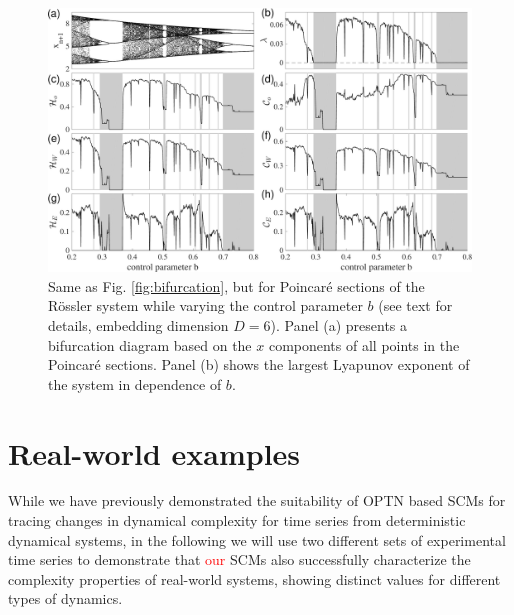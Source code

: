 \documentclass[aip,cha,reprint,nofootinbib]{revtex4-1}
\begin{document}
\begin{figure}
	\centering 
	\includegraphics[width=2\columnwidth]{rosslerEntropy.pdf}
\caption{\small{Same as Fig. \ref{fig:bifurcation}, but for Poincar\'e sections of the R\"ossler system while varying the control parameter $b$ (see text for details{\color{red}, embedding dimension $D = 6$).} Panel (a) presents a bifurcation diagram based on the $x$ components of all points in the Poincar\'e sections. Panel (b) shows the largest Lyapunov exponent of the system in dependence of $b$.} \label{fig:bifurRossler}}
\end{figure}


\section{Real-world examples} \label{sec:time}
While we have previously demonstrated the suitability of OPTN based SCMs for tracing changes in dynamical complexity for time series from deterministic dynamical systems, in the following we will use two different sets of experimental time series to demonstrate that \textcolor{red}{our} SCMs also successfully characterize the complexity properties of real-world systems, showing distinct values for different types of dynamics. 
\end{document}
